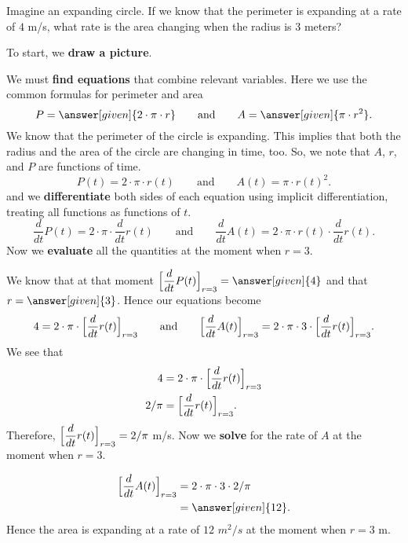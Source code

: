\documentclass{ximera}
\begin{document}
\begin{example}
  Imagine an expanding circle. If we know that the perimeter is
  expanding at a rate of $4$ m/s, what rate is the area changing
  when the radius is $3$ meters?
  \begin{explanation}
    To start, we \textbf{draw a picture}.
    \begin{image}
    \end{image}
    We must \textbf{find equations} that combine relevant
   variables. Here we use the common formulas for perimeter and area
    \[
    P = \answer[given]{2\cdot \pi \cdot r}
    \qquad\text{and}\qquad
    A = \answer[given]{\pi \cdot r^2}.
    \]
   We know that the perimeter of the circle is expanding. This implies that both the radius and the area of the circle are changing in time, too.
    So, we note that $A$, $r$, and $P$ are functions of time. 
    \[
    P(t) = 2\cdot \pi \cdot r(t)
    \qquad\text{and}\qquad
    A(t) = \pi \cdot r(t)^2.
    \]
    and we \textbf{differentiate} both sides of each equation using implicit
    differentiation, treating all functions as functions of $t$.
    \[
    \dfrac{d}{dt}P(t) = 2\cdot \pi\cdot  \dfrac{d}{dt}r(t)
    \qquad\text{and}\qquad
     \dfrac{d}{dt}A(t) = 2\cdot \pi\cdot r(t) \cdot  \dfrac{d}{dt}r(t).
    \]
    Now we \textbf{evaluate} all the quantities at the moment when $r=3$.
    
     We know  that at that moment $\Bigl[ \dfrac{d}{dt}P(t)\Bigr]_{r=3} =
    \answer[given]{4}$ and that $r = \answer[given]{3}$. Hence our
    equations become
    \[
    4 = 2\cdot \pi\cdot \Bigl[\dfrac{d}{dt}r(t)\Bigr]_{r=3}
    \qquad\text{and}\qquad
   \Bigl[ \dfrac{d}{dt}A(t)\Bigr]_{r=3} = 2\cdot \pi\cdot 3 \cdot \Bigl[\dfrac{d}{dt}r(t)  \Bigl]_{r=3}.
    \]
    We see that
    \begin{align*}
       4 &= 2\cdot \pi\cdot \Bigl[\dfrac{d}{dt}r(t)\Bigr]_{r=3}\\
      2/\pi &=  \Bigl[\dfrac{d}{dt}r(t)\Bigr]_{r=3}.
    \end{align*}
    Therefore, $\Bigl[\dfrac{d}{dt}r(t)\Bigr]_{r=3}= 2/\pi$ m/s.
   Now we \textbf{solve} for the rate of $A$ at the moment when $r=3$.
   
    \begin{align*}
     \Bigl[ \dfrac{d}{dt}A(t)\Bigr]_{r=3} &= 2\cdot \pi\cdot 3 \cdot 2/\pi\\
      &=\answer[given]{12}.
    \end{align*}
    Hence the area is expanding at a rate of $12$ $m^2/s$ at the moment when $r=3$ m.
  \end{explanation}
\end{example}
\end{document}
